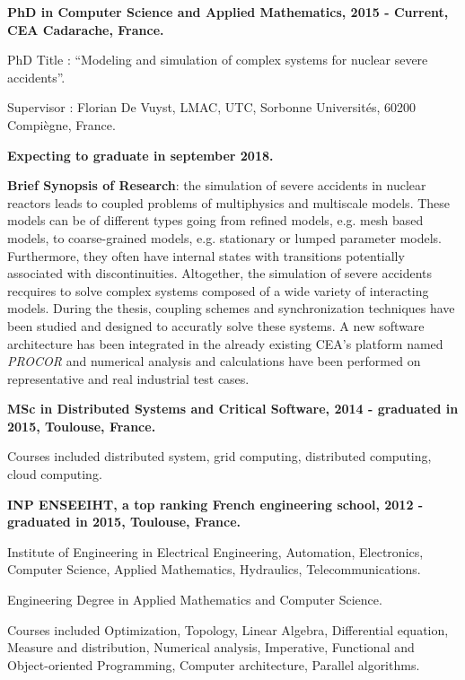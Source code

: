 \documentclass{article}
\renewenvironment{itemize}{
  \begin{list}{}{
      \setlength{\leftmargin}{1.5em}
      \setlength{\itemsep}{0.25em}
      \setlength{\parskip}{0pt}
      \setlength{\parsep}{0.25em}
    }
}{
  \end{list}
}
\begin{document}
\begin{itemize}
  	\item \textbf{PhD in Computer Science and Applied Mathematics, 2015 - Current, CEA Cadarache, France.}
		\begin{itemize}
			\item PhD Title : ``Modeling and simulation of complex systems for nuclear severe accidents''.
			\item Supervisor : Florian De Vuyst, LMAC, UTC, Sorbonne Universités, 60200 Compiègne, France.
			\item \textbf{Expecting to graduate in september 2018.}
			\item \textbf{Brief Synopsis of Research}: the simulation of severe accidents in nuclear reactors leads to coupled problems of multiphysics and multiscale models. These models can be of different types going from refined models, e.g. mesh based models, to coarse-grained models, e.g. stationary or lumped parameter models. Furthermore, they often have internal states with transitions potentially associated with discontinuities. Altogether, the simulation of severe accidents recquires to solve complex systems composed of a wide variety of interacting models. During the thesis, coupling schemes and synchronization techniques have been studied and designed to accuratly solve these systems. A new software architecture has been integrated in the already existing CEA's platform named \textit{PROCOR} and numerical analysis and calculations have been performed on representative and real industrial test cases.
		\end{itemize}
	\item \textbf{MSc in Distributed Systems and Critical Software, 2014 - graduated in 2015, Toulouse, France.}
		\begin{itemize}
			\item Courses included distributed system, grid computing, distributed computing, cloud computing.
		\end{itemize}
    \item \textbf{INP ENSEEIHT, a top ranking French engineering school, 2012 - graduated in 2015, Toulouse, France.}
		\begin{itemize}
			\item Institute of Engineering in Electrical Engineering, Automation, Electronics, Computer Science, Applied Mathematics, Hydraulics, Telecommunications.
			\item Engineering Degree in Applied Mathematics and Computer Science.
			\item Courses included Optimization, Topology, Linear Algebra, Differential equation, Measure and distribution, Numerical analysis, Imperative, Functional and Object-oriented Programming, Computer architecture, Parallel algorithms.

\end{itemize}
\end{itemize}
\end{document}
